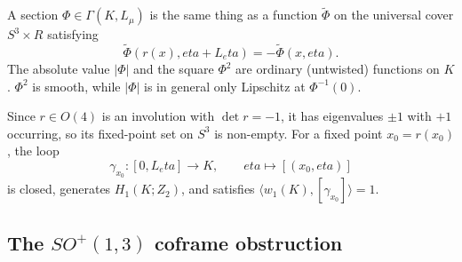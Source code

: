 \documentclass[11pt]{article}
\theoremstyle{canonmath}
\theoremstyle{canonpostulate}
\theoremstyle{canonproposition}
\theoremstyle{canonmath}
\theoremstyle{canonproposition}
\providecommand{\Lmu}{\mathcal{L}_\mu}
\providecommand{\Klein}{\mathcal{K}}
\providecommand{\R}{\mathbb{R}}
\providecommand{\Ztwo}{\mathbb{Z}_2}
\def\mathrm#1{#1}%
\def\mathbb#1{#1}%
\def\mathcal#1{#1}%
\def\eta{eta}%
\begin{document}
A section $\Phi \in \Gamma(\Klein, \Lmu)$ is the same thing as a function $\widetilde{\Phi}$ on the universal cover $S^3 \times \R$ satisfying
\begin{equation}
\widetilde{\Phi}(r(x), \eta + L_\eta) = -\widetilde{\Phi}(x, \eta).
\label{eq:twisted_section}
\end{equation}
The absolute value $|\Phi|$ and the square $\Phi^2$ are ordinary (untwisted) functions on $\Klein$. $\Phi^2$ is smooth, while $|\Phi|$ is in general only Lipschitz at $\Phi^{-1}(0)$.

Since $r \in \mathrm{O}(4)$ is an involution with $\det r = -1$, it has eigenvalues $\pm1$ with $+1$ occurring, so its fixed-point set on $S^3$ is non-empty. For a fixed point $x_0 = r(x_0)$, the loop
\begin{equation}
\gamma_{x_0}: [0, L_\eta] \to \Klein, \qquad \eta \mapsto [(x_0, \eta)]
\label{eq:loop}
\end{equation}
is closed, generates $H_1(\Klein;\Ztwo)$, and satisfies $\langle w_1(\Klein), [\gamma_{x_0}]\rangle = 1$.

\subsection{The \texorpdfstring{$SO^+(1,3)$}{SO+(1,3)} coframe obstruction}
\end{document}
